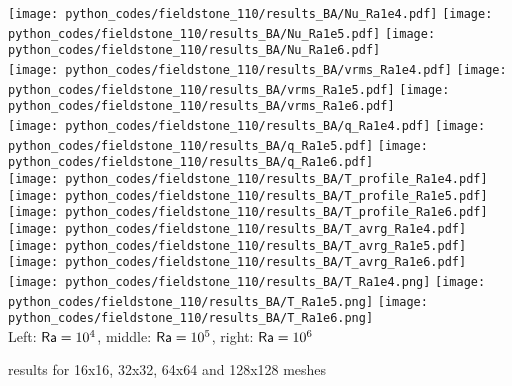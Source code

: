 \begin{center}
\texttt{[image: python\_codes/fieldstone\_110/results\_BA/Nu\_Ra1e4.pdf]}
\texttt{[image: python\_codes/fieldstone\_110/results\_BA/Nu\_Ra1e5.pdf]}
\texttt{[image: python\_codes/fieldstone\_110/results\_BA/Nu\_Ra1e6.pdf]}\\
\texttt{[image: python\_codes/fieldstone\_110/results\_BA/vrms\_Ra1e4.pdf]}
\texttt{[image: python\_codes/fieldstone\_110/results\_BA/vrms\_Ra1e5.pdf]}
\texttt{[image: python\_codes/fieldstone\_110/results\_BA/vrms\_Ra1e6.pdf]}\\
\texttt{[image: python\_codes/fieldstone\_110/results\_BA/q\_Ra1e4.pdf]}
\texttt{[image: python\_codes/fieldstone\_110/results\_BA/q\_Ra1e5.pdf]}
\texttt{[image: python\_codes/fieldstone\_110/results\_BA/q\_Ra1e6.pdf]}\\
\texttt{[image: python\_codes/fieldstone\_110/results\_BA/T\_profile\_Ra1e4.pdf]}
\texttt{[image: python\_codes/fieldstone\_110/results\_BA/T\_profile\_Ra1e5.pdf]}
\texttt{[image: python\_codes/fieldstone\_110/results\_BA/T\_profile\_Ra1e6.pdf]}\\
\texttt{[image: python\_codes/fieldstone\_110/results\_BA/T\_avrg\_Ra1e4.pdf]}
\texttt{[image: python\_codes/fieldstone\_110/results\_BA/T\_avrg\_Ra1e5.pdf]}
\texttt{[image: python\_codes/fieldstone\_110/results\_BA/T\_avrg\_Ra1e6.pdf]}\\
\texttt{[image: python\_codes/fieldstone\_110/results\_BA/T\_Ra1e4.png]}
\texttt{[image: python\_codes/fieldstone\_110/results\_BA/T\_Ra1e5.png]}
\texttt{[image: python\_codes/fieldstone\_110/results\_BA/T\_Ra1e6.png]}\\
{\captionfont Left: ${\mathsf{Ra}}=10^4$, middle: ${\mathsf{Ra}}=10^5$, right: ${\mathsf{Ra}}=10^6$} 
\end{center}

\newpage
\aspect results for 16x16, 32x32, 64x64 and 128x128 meshes

